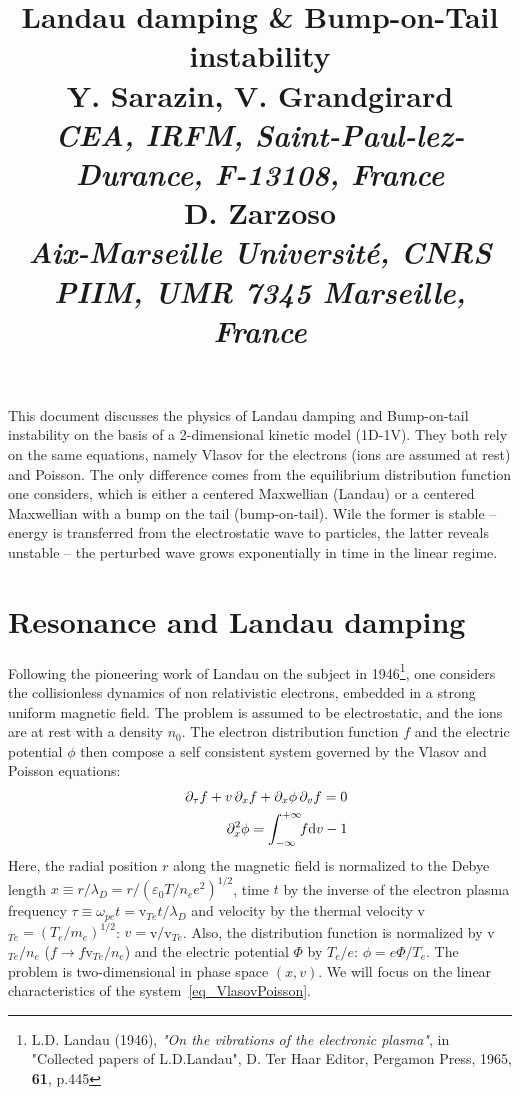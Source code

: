 \documentclass[11pt]{article}
\title{
	{\Large {\bf Landau damping \& Bump-on-Tail instability}} \\
	{\Large  Y. Sarazin, V. Grandgirard} \\
	{\small\it  CEA, IRFM, Saint-Paul-lez-Durance, F-13108, France} \\
	{\Large  D. Zarzoso} \\
	{\small\it  Aix-Marseille Universit\'e, CNRS PIIM, UMR 7345 Marseille, France}}
\newcommand{\dd}{\textrm d}
\begin{document}
	\maketitle


This document discusses the physics of Landau damping and Bump-on-tail instability on the basis of a 2-dimensional kinetic model (1D-1V).
They both rely on the same equations, namely Vlasov for the electrons (ions are assumed at rest) and Poisson. The only difference comes from the equilibrium distribution function one considers, which is either a centered Maxwellian (Landau) or a centered Maxwellian with a bump on the tail (bump-on-tail). Wile the former is stable -- energy is transferred from the electrostatic wave to particles, the latter reveals unstable -- the perturbed wave grows exponentially in time in the linear regime.

\section{Resonance and Landau damping} \label{sec:Landau}
\label{s_LandauDamping}

Following the pioneering work of Landau on the subject in 1946\footnote{ L.D. Landau (1946), \emph{"On the vibrations of the electronic plasma"}, in "Collected papers of L.D.Landau", D. Ter Haar Editor, Pergamon Press, 1965, {\bf 61}, p.445}, one considers the collisionless dynamics of non relativistic electrons, embedded in a strong uniform magnetic field. The problem is assumed to be electrostatic, and the ions are at rest with a density $n_0$. The electron distribution function $f$ and the electric potential $\phi$ then compose a self consistent system governed by the Vlasov and Poisson equations:
\begin{eqnarray}\label{eq_VlasovPoisson}
  && \partial_{\tau}f + v\,\partial_{x}f +
     \partial_{x}\phi\,\partial_{v}f = 0 \\
  && \partial^{2}_{x}\phi = \int_{-\infty}^{+\infty}\!\! f \dd v -1
  \nonumber
\end{eqnarray}
Here, the radial position $r$ along the magnetic field is normalized to the Debye length $x \equiv r/\lambda_D =r/ (\varepsilon_0T/n_ee^2)^{1/2}$, time $t$ by the inverse of the electron plasma frequency $\tau\equiv \omega_{pe}t = $v$_{Te}t/\lambda_D$ and velocity by the thermal velocity v$_{Te} =(T_e/m_e)^{1/2}$: $v=$v$/$v$_{Te}$. Also, the distribution function is normalized by v$_{Te}/n_e$ ($f\rightarrow f$v$_{Te}/n_e$) and the electric potential $\Phi$ by $T_e/e$: $\phi=e\Phi/T_e$. The problem is two-dimensional in phase space $(x,v)$. We will focus on the linear characteristics of the system~\eqref{eq_VlasovPoisson}. \\
\end{document}
